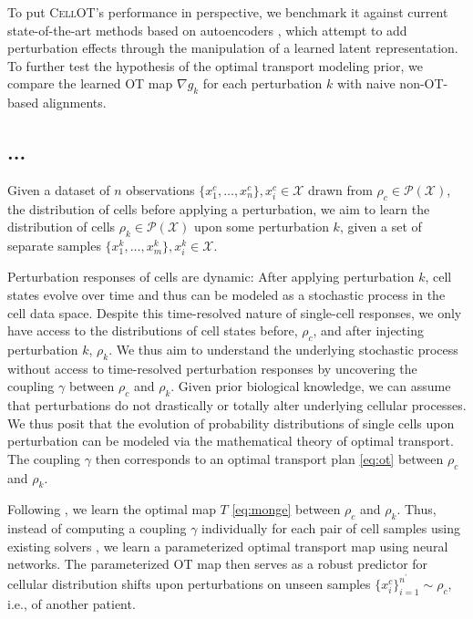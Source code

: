 To put \textsc{CellOT}'s performance in perspective, we benchmark it against current state-of-the-art methods based on autoencoders \citep{lotfollahi2019scgen, lopez2018scvi}, which attempt to add perturbation effects through the manipulation of a learned latent representation.
To further test the hypothesis of the optimal transport modeling prior, we compare the learned OT map $\nabla g_k$ for each perturbation $k$ with naive non-OT-based alignments.




\subsection{...}

Given a dataset of $n$ observations $\{ x_1^c, \dots, x_n^c \}, x_i^c \in \mathcal{X}$ drawn from $\rho_c \in \mathcal{P}(\mathcal{X})$, the distribution of cells before applying a perturbation,
we aim to learn the distribution of cells $\rho_k \in \mathcal{P}(\mathcal{X})$ upon some perturbation $k$, given a set of separate samples $\{ x_1^k, \dots, x_m^k \}, x_i^k \in \mathcal{X}$.

Perturbation responses of cells are dynamic: After applying perturbation $k$, cell states evolve over time and thus can be modeled as a stochastic process in the cell data space.
Despite this time-resolved nature of single-cell responses, we only have access to the distributions of cell states before, $\rho_c$, and after injecting perturbation $k$, $\rho_k$. 
We thus aim to understand the underlying stochastic process without access to time-resolved perturbation responses by uncovering the coupling $\gamma$ between $\rho_c$ and $\rho_k$.
Given prior biological knowledge, we can assume that perturbations do not drastically or totally alter underlying cellular processes. We thus posit that the evolution of probability distributions of single cells upon perturbation
can be modeled via the mathematical theory of optimal transport.
The coupling $\gamma$ then corresponds to an optimal transport plan \eqref{eq:ot} between $\rho_c$ and $\rho_k$.

Following \citet{makkuva2020optimal}, we learn the optimal map $T$ \eqref{eq:monge} between $\rho_c$ and $\rho_k$.
Thus, instead of computing a coupling $\gamma$ individually for each pair of cell samples using existing solvers \citep{cuturi2013sinkhorn}, we learn a parameterized optimal transport map using neural networks. The parameterized OT map then serves as a robust predictor for cellular distribution shifts upon perturbations on unseen samples $\{x_i^{c} \}_{i=1}^{n^\prime} \sim \rho_c$, i.e., of another patient.




